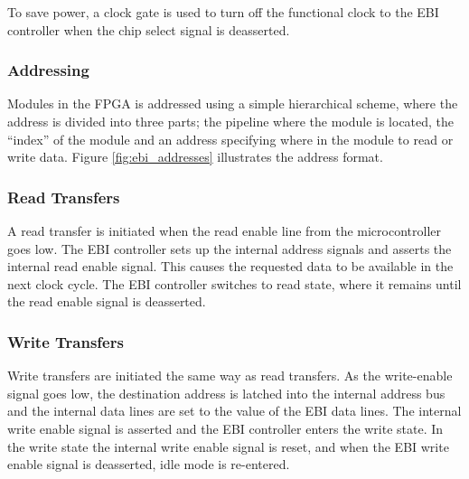 To save power, a clock gate is used to turn off the functional clock to
the EBI controller when the chip select signal is deasserted.



\subsubsection{Addressing}

Modules in the FPGA is addressed using a simple hierarchical scheme, where the
address is divided into three parts; the pipeline where the module is located,
the ``index'' of the module and an address specifying where in the module to
read or write data. Figure \ref{fig:ebi_addresses} illustrates the address
format.



\FloatBarrier
\subsubsection{Read Transfers}

A read transfer is initiated when the read enable line from the microcontroller 
goes low. The EBI controller sets up the internal address signals and asserts 
the internal read enable signal. This causes the requested data to be available 
in the next clock cycle. The EBI controller switches to read state, where it 
remains until the read enable signal is deasserted.

\subsubsection{Write Transfers}

Write transfers are initiated the same way as read transfers. As the 
write-enable signal goes low, the destination address is latched into the 
internal address bus and the internal data lines are set to the value of the 
EBI data lines. The internal write enable signal is asserted and the EBI 
controller enters the write state. In the write state the internal write enable 
signal is reset, and when the EBI write enable signal is deasserted, idle mode 
is re-entered.
